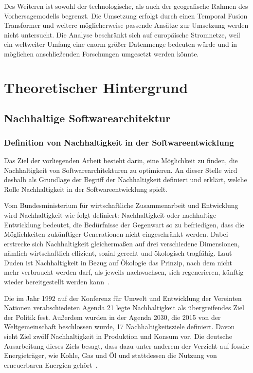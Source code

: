 
Des Weiteren ist sowohl der technologische, als auch der geografische Rahmen des Vorhersagemodells begrenzt.
Die Umsetzung erfolgt durch einen Temporal Fusion Transformer und weitere möglicherweise passende Ansätze zur Umsetzung werden nicht untersucht.
Die Analyse beschränkt sich auf europäische Stromnetze, weil ein weltweiter Umfang eine enorm größer Datenmenge bedeuten würde und in möglichen anschließenden Forschungen umgesetzt werden könnte.

\chapter{Theoretischer Hintergrund}
\section{Nachhaltige Softwarearchitektur}
\subsection{Definition von Nachhaltigkeit in der Softwareentwicklung}
Das Ziel der vorliegenden Arbeit besteht darin, eine Möglichkeit zu finden, die Nachhaltigkeit von Softwarearchitekturen zu optimieren.
An dieser Stelle wird deshalb als Grundlage der Begriff der Nachhaltigkeit definiert und erklärt, welche Rolle Nachhaltigkeit in der Softwareentwicklung spielt.

Vom Bundesministerium für wirtschaftliche Zusammenarbeit und Entwicklung~\cite{BundesministeriumWirtschaftlicheZusammenarbeitundEntwicklung} wird Nachhaltigkeit wie folgt definiert:
\glqq Nachhaltigkeit oder nachhaltige Entwicklung bedeutet, die Bedürfnisse der Gegenwart so zu befriedigen, dass die Möglichkeiten zukünftiger Generationen nicht eingeschränkt werden.\grqq{}
Dabei erstrecke sich Nachhaltigkeit gleichermaßen auf drei verschiedene Dimensionen, nämlich wirtschaftlich effizient, sozial gerecht und ökologisch tragfähig.
Laut Duden ist Nachhaltigkeit in Bezug auf Ökologie das \glqq Prinzip, nach dem nicht mehr verbraucht werden darf, als jeweils nachwachsen, sich regenerieren, künftig wieder bereitgestellt werden kann\grqq{}~\cite{Dudenredaktion.27.04.2018}.

Die im Jahr 1992 auf der Konferenz für Umwelt und Entwicklung der Vereinten Nationen verabschiedeten Agenda 21 legte Nachhaltigkeit als übergreifendes Ziel der Politik fest.
Außerdem wurden in der Agenda 2030, die 2015 von der Weltgemeinschaft beschlossen wurde, 17 Nachhaltigkeitsziele definiert.
Davon sieht Ziel zwölf Nachhaltigkeit in Produktion und Konsum vor.
Die deutsche Ausarbeitung dieses Ziels besagt, dass dazu unter anderem der Verzicht auf fossile Energieträger, wie Kohle, Gas und Öl und stattdessen die Nutzung von erneuerbaren Energien gehört~\cite{Bundesregierunginformiert}.

